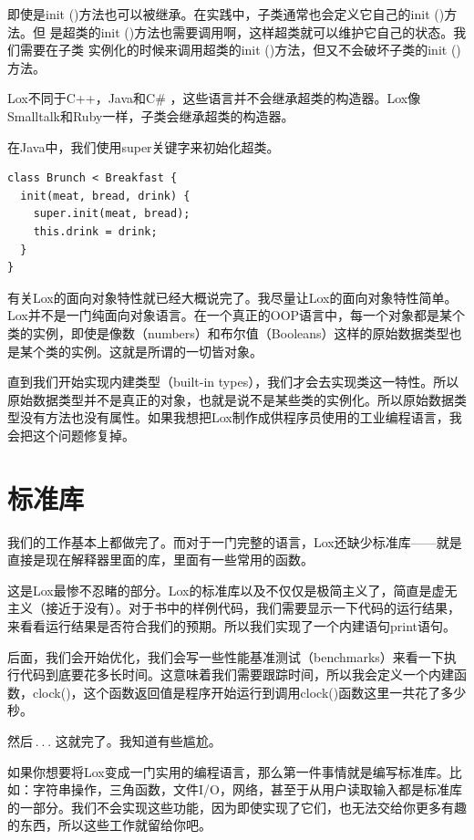 \documentclass[cn,10pt,math=newtx,citestyle=gb7714-2015,bibstyle=gb7714-2015]{elegantbook}
\begin{document}
即使是init ()方法也可以被继承。在实践中，子类通常也会定义它自己的init ()方法。但
是超类的init ()方法也需要调用啊，这样超类就可以维护它自己的状态。我们需要在子类
实例化的时候来调用超类的init ()方法，但又不会破坏子类的init ()方法。

\begin{tcolorbox}
Lox不同于C++，Java和C\# ，这些语言并不会继承超类的构造器。Lox像Smalltalk和Ruby一样，子类会继承超类的构造器。
\end{tcolorbox}

在Java中，我们使用super关键字来初始化超类。

\begin{verbatim}
class Brunch < Breakfast {
  init(meat, bread, drink) {
    super.init(meat, bread);
    this.drink = drink;
  }
}
\end{verbatim}

有关Lox的面向对象特性就已经大概说完了。我尽量让Lox的面向对象特性简单。Lox并不是一门纯面向对象语言。在一个真正的OOP语言中，每一个对象都是某个类的实例，即使是像数（numbers）和布尔值（Booleans）这样的原始数据类型也是某个类的实例。这就是所谓的一切皆对象。

直到我们开始实现内建类型（built-in types），我们才会去实现类这一特性。所以原始数据类型并不是真正的对象，也就是说不是某些类的实例化。所以原始数据类型没有方法也没有属性。如果我想把Lox制作成供程序员使用的工业编程语言，我会把这个问题修复掉。

\section{标准库}

我们的工作基本上都做完了。而对于一门完整的语言，Lox还缺少标准库——就是直接是现在解释器里面的库，里面有一些常用的函数。

这是Lox最惨不忍睹的部分。Lox的标准库以及不仅仅是极简主义了，简直是虚无主义（接近于没有）。对于书中的样例代码，我们需要显示一下代码的运行结果，来看看运行结果是否符合我们的预期。所以我们实现了一个内建语句print语句。

后面，我们会开始优化，我们会写一些性能基准测试（benchmarks）来看一下执行代码到底要花多长时间。这意味着我们需要跟踪时间，所以我会定义一个内建函数，clock()，这个函数返回值是程序开始运行到调用clock()函数这里一共花了多少秒。

然后 . . . 这就完了。我知道有些尴尬。

如果你想要将Lox变成一门实用的编程语言，那么第一件事情就是编写标准库。比如：字符串操作，三角函数，文件I/O，网络，甚至于从用户读取输入都是标准库的一部分。我们不会实现这些功能，因为即使实现了它们，也无法交给你更多有趣的东西，所以这些工作就留给你吧。
\end{document}
